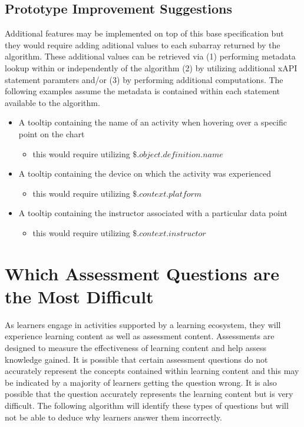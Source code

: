 \documentclass{article}
\begin{document}
\subsection{Prototype Improvement Suggestions}
Additional features may be implemented on top of this base
specification but they would require adding aditional values to each
subarray returned by the algorithm. These additional values can be
retrieved via (1) performing metadata lookup within or independently of the
algorithm (2) by utilizing additional xAPI statement paramters and/or (3) by
performing additional computations. The following examples assume the
metadata is contained within each statement available to the algorithm.
\begin{itemize}
\item A tooltip containing the name of an activity when hovering
  over a specific point on the chart
  \begin{itemize}
    \item this would require utilizing $\$.object.definition.name$
  \end{itemize}
\item A tooltip containing the device on which the activity was experienced
  \begin{itemize}
    \item this would require utilizing $\$.context.platform$
  \end{itemize}
\item A tooltip containing the instructor associated with a
  particular data point
  \begin{itemize}
    \item this would require utilizing $\$.context.instructor$
  \end{itemize}
\end{itemize}

\section{Which Assessment Questions are the Most Difficult}
As learners engage in activities supported by a learning ecosystem, they will
experience learning content as well as assessment content. Assessments
are designed to measure the effectiveness of learning content and help
assess knowledge gained. It is possible that certain assessment questions
do not accurately represent the concepts contained within learning
content and this may be indicated by a majority of learners getting
the question wrong. It is also possible that the question accurately
represents the learning content but is very difficult. The following
algorithm will identify these types of questions but will not be able to deduce
why learners answer them incorrectly.
\end{document}
